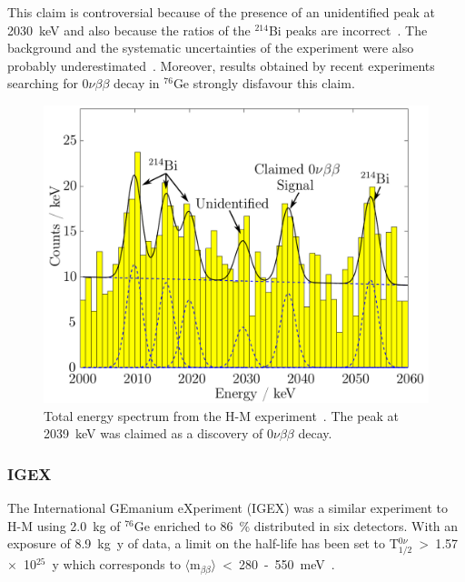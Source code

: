 \documentclass[main.tex]{subfiles}
\begin{document}
\bigskip


\NI This claim is controversial because of the presence of an unidentified peak at 2030~keV and also because the ratios of the $^{\text{214}}$Bi peaks are incorrect~\cite{HeidelbergMoscow3}. The background and the systematic uncertainties of the experiment were also probably underestimated~\cite{HeidelbergMoscow3}. Moreover, results obtained by recent experiments searching for 0$\nu\beta\beta$ decay in $^{\text{76}}$Ge strongly disfavour this claim.



\begin{figure}[h!]
\begin{center}
\includegraphics[scale=0.24]{pictures/Chap2/H-M-experiment-claim.png}
\caption{Total energy spectrum from the H-M experiment~\cite{HeidelbergMoscow1}. The peak at 2039~keV was claimed as a discovery of 0$\nu\beta\beta$ decay.}
\label{HMexperimentClaim}
\end{center}
\end{figure}


\FloatBarrier

\subsubsection{IGEX}


\NI The International GEmanium eXperiment (IGEX) was a similar experiment to H-M using 2.0~kg of $^{\text{76}}$Ge enriched to 86~\% distributed in six detectors. With an exposure of 8.9~kg~y of data, a limit on the half-life has been set to T$_{\text{1/2}}^{0\nu}$~>~1.57~$\times$~10$^{\text{25}}$~y which corresponds to $\langle \text{m}_{\beta\beta} \rangle$~<~280~-~550~meV~\cite{IGEX}.
\end{document}
